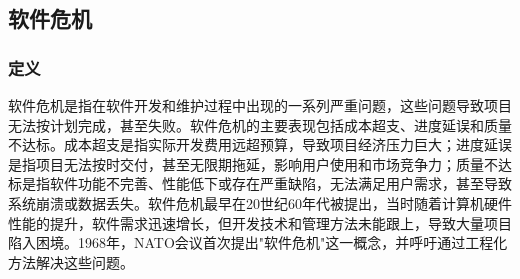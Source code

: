 \subsection{软件危机}

\subsubsection{定义}

软件危机是指在软件开发和维护过程中出现的一系列严重问题，这些问题导致项目无法按计划完成，甚至失败。软件危机的主要表现包括成本超支、进度延误和质量不达标。成本超支是指实际开发费用远超预算，导致项目经济压力巨大；进度延误是指项目无法按时交付，甚至无限期拖延，影响用户使用和市场竞争力；质量不达标是指软件功能不完善、性能低下或存在严重缺陷，无法满足用户需求，甚至导致系统崩溃或数据丢失。软件危机最早在20世纪60年代被提出，当时随着计算机硬件性能的提升，软件需求迅速增长，但开发技术和管理方法未能跟上，导致大量项目陷入困境。1968年，NATO会议首次提出"软件危机"这一概念，并呼吁通过工程化方法解决这些问题。